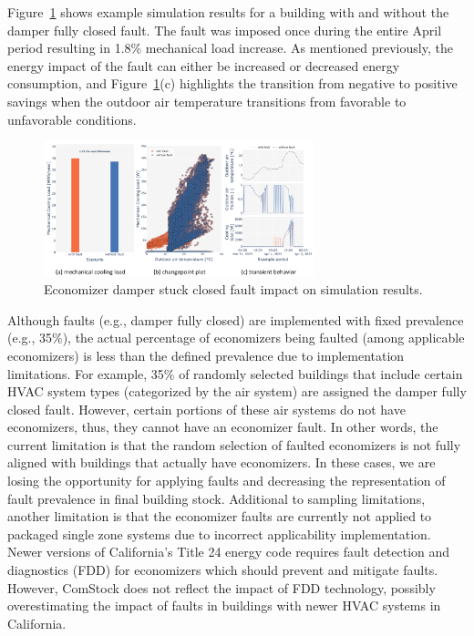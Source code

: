 Figure~\ref{fig:econ_damper_fault_single_model} shows example simulation results for a building with and without the damper fully closed fault. The fault was imposed once during the entire April period resulting in 1.8\% mechanical load increase. As mentioned previously, the energy impact of the fault can either be increased or decreased energy consumption, and Figure~\ref{fig:econ_damper_fault_single_model}(c) highlights the transition from negative to positive savings when the outdoor air temperature transitions from favorable to unfavorable conditions.

\begin{figure}
  \centering \includegraphics[width=0.7\textwidth]{figures/econ_damper_fault_single_model.png}
  \caption{Economizer damper stuck closed fault impact on simulation results.}
  \label{fig:econ_damper_fault_single_model}
\end{figure}

Although faults (e.g., damper fully closed) are implemented with fixed prevalence (e.g., 35\%), the actual percentage of economizers being faulted (among applicable economizers) is less than the defined prevalence due to implementation limitations. For example, 35\% of randomly selected buildings that include certain HVAC system types (categorized by the air system) are assigned the damper fully closed fault. However, certain portions of these air systems do not have economizers, thus, they cannot have an economizer fault. In other words, the current limitation is that the random selection of faulted economizers is not fully aligned with buildings that actually have economizers. In these cases, we are losing the opportunity for applying faults and decreasing the representation of fault prevalence in final building stock. Additional to sampling limitations, another limitation is that the economizer faults are currently not applied to packaged single zone systems due to incorrect applicability implementation. Newer versions of California's Title 24 energy code requires fault detection and diagnostics (FDD) for economizers which should prevent and mitigate faults. However, ComStock does not reflect the impact of FDD technology, possibly overestimating the impact of faults in buildings with newer HVAC systems in California.

